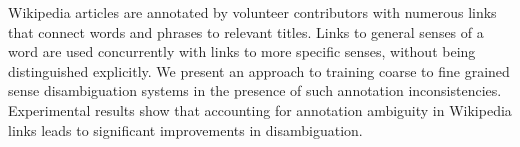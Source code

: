Wikipedia articles are annotated by volunteer contributors with numerous links that connect words and phrases to relevant titles. Links to general senses of a
 word are used concurrently with links to more specific senses, without being
 distinguished explicitly. We present an approach to training coarse to fine
 grained sense disambiguation systems in the presence of such annotation
 inconsistencies. Experimental results show that accounting for annotation
 ambiguity in Wikipedia links leads to significant improvements in
 disambiguation.

